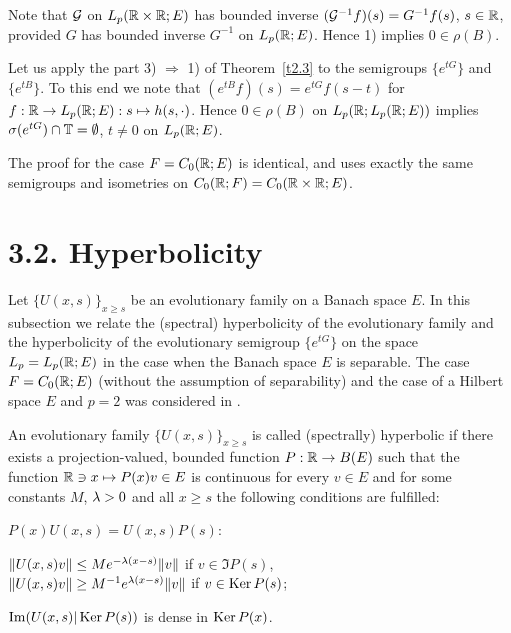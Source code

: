 \begin{pf}
Note that ${\cal{G}}$ on $L_p({\Bbb{R}} \times {\Bbb{R}};E)$ has bounded inverse
$({\cal{G}}^{-1} f)(s)=G^{-1} f(s)$, $s\in{\Bbb{R}}$, provided $G$ has
bounded inverse $G^{-1}$ on $L_p ({\Bbb{R}};E)$.  Hence 1) implies $0\in\rho
(B)$.

Let us apply the part  3) $\Rightarrow$ 1) of
Theorem~\ref{t2.3} to the semigroups $\{e^{tG}\}$ and
$\{e^{tB}\}$.  To this end we note that $(e^{tB}f)(s) =e^{tG} f(s-t)$ for
$f:{\Bbb{R}} \to L_p ({\Bbb{R}};E): s\mapsto h(s,\cdot)$.  Hence $0\in\rho (B)$ on
$L_p ({\Bbb{R}};L_p ({\Bbb{R}};E))$ implies $\sigma (e^{tG}) \cap {\Bbb{T}} =\emptyset$,
$t\neq 0$ on $L_p ({\Bbb{R}};E)$.

The proof for the case $F= C_0({\Bbb{R}};E)$ is
identical, and uses exactly the same semigroups and isometries
on $C_0({\Bbb{R}};F) = C_0({\Bbb{R}}\times{\Bbb{R}};E)$.
\end{pf}


\section*{3.2.  Hyperbolicity}

Let $\{U(x,s)\}_{x\geq s}$ be an
evolutionary family on a Banach space $E$. In this subsection
we relate the (spectral) hyperbolicity of the evolutionary
family and the hyperbolicity of the evolutionary
semigroup $\{e^{tG}\}$ on the space $L_p=L_p({\Bbb{R}};E)$ in the case
when the
Banach space $E$ is separable.
The case $F= C_0({\Bbb{R}};E)$
(without the assumption of separability)
and the case of a Hilbert space $E$ and $p=2$
was considered in \cite{27,28}.

\begin{defn}
An evolutionary family $\{U(x,s)\}_{x \geq s}$ is called (spectrally)
hyperbolic if there exists a projection-valued, bounded function $P:{\Bbb{R}}
\to B(E)$ such that the function ${\Bbb{R}} \ni x \mapsto P(x) v\in E$ is
continuous for every $v\in E$ and for some constants $M$, $\lambda >0$
and all $x\geq s$ the
following conditions are fulfilled:
\begin{list}{)}{}
\item  $P(x) U (x,s) =U(x,s) P(s)$:
\item  $\| U(x,s) v\| \leq Me^{-\lambda (x-s)} \|v\|$ if $v\in \Im P(s)$,\\
$\|U(x,s) v \| \geq M^{-1} e^{\lambda (x-s)} \|v\|$ if $v\in \operatorname{Ker} P(s)$;
\item $\operatorname{Im} (U(x,s) | \operatorname{Ker} P(s))$ is dense in $\operatorname{Ker} P(x)$.
\end{list}
\end{defn}


